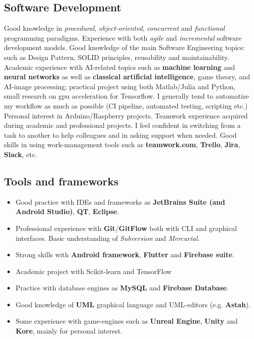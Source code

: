 \documentclass[letterpaper]{twentysecondcv} %
\begin{document}
\subsection{Software Development}
\small
Good knowledge in \textit{procedural}, \textit{object-oriented}, \textit{concurrent} and \textit{functional} programming paradigms.\newline
Experience with both \textit{agile} and \textit{incremental} software development models.\newline
Good knowledge of the main Software Engineering topics: such as Design Pattern, SOLID principles, reusability and maintainability.
Academic experience with AI-related topics such as \textbf{machine learning} and \textbf{neural networks} as well as \textbf{classical artificial intelligence}, game theory, and AI-image processing; practical project using both Matlab/Julia and Python, small research on gpu acceleration for Tensorflow.
I generally tend to automatize my workflow as much as possible (CI pipeline, automated testing, scripting etc.) \newline
Personal interest in Arduino/Raspberry projects.\newline
Teamwork experience acquired during academic and professional projects. I feel confident in switching from a task to another to help colleagues and in asking support when needed. Good skills in using work-management tools such as \textbf{teamwork.com}, \textbf{Trello}, \textbf{Jira}, \textbf{Slack}, etc.\newline



\subsection{Tools and frameworks}
\small
\begin{itemize}[noitemsep,nolistsep]
	\item Good practice with IDEs and frameworks as \textbf{JetBrains Suite (and Android Studio)}, \textbf{QT}, \textbf{Eclipse}.
	\item Professional experience with \textbf{Git}/\textbf{GitFlow} both with CLI and graphical interfaces. Basic understanding of \textit{Subversion} and \textit{Mercurial}.
	\item Strong skills with \textbf{Android framework}, \textbf{Flutter} and \textbf{Firebase suite}.
	\item Academic project with Scikit-learn and TensorFlow
	\item Practice with database engines as \textbf{MySQL} and \textbf{Firebase Database}.
	\item Good knowledge of \textbf{UML} graphical language and UML-editors (e.g. \textbf{Astah}).
	\item Some experience with game-engines such as \textbf{Unreal Engine}, \textbf{Unity} and \textbf{Kore}, mainly for personal interest.
\end{itemize}
\end{document}
